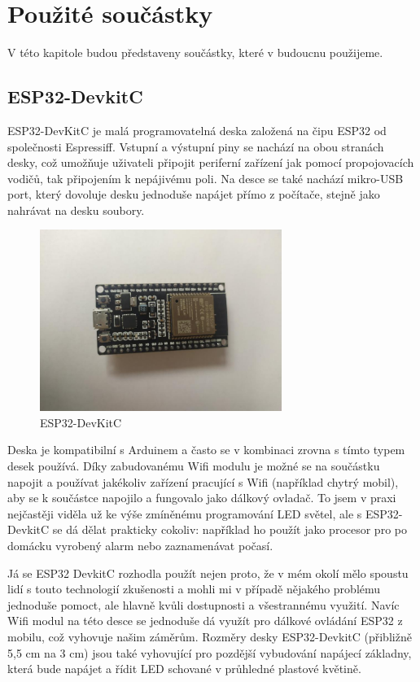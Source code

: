 \chapter{Použité součástky}

V této kapitole budou představeny součástky, které v budoucnu použijeme.

\section{ESP32-DevkitC}
ESP32-DevKitC je malá programovatelná deska založená na čipu ESP32 od společnosti Espressiff. Vstupní a výstupní piny se nachází na obou stranách desky, což umožňuje uživateli připojit periferní zařízení jak pomocí propojovacích vodičů, tak připojením k nepájivému poli. Na desce se také nachází mikro-USB port, který dovoluje  desku jednoduše napájet přímo z počítače, stejně jako nahrávat na desku soubory. 

\begin{figure}[htbp]
	\centering
	\includegraphics[width=0.7\textwidth]{img/ESPDevKit.jpg}
	\caption{ESP32-DevKitC}
\end{figure}

Deska je kompatibilní s Arduinem a často se v kombinaci zrovna s tímto typem desek používá. Díky zabudovanému Wifi modulu je možné se na součástku napojit a používat jakékoliv zařízení pracující s Wifi (například chytrý mobil), aby se k součástce napojilo a fungovalo jako dálkový ovladač. To jsem v praxi nejčastěji viděla už ke výše zmíněnému programování LED světel, ale s  ESP32-DevkitC se dá dělat prakticky cokoliv: například ho použít jako procesor pro po domácku vyrobený alarm nebo zaznamenávat počasí. 


Já se ESP32 DevkitC rozhodla použít nejen proto, že v mém okolí mělo spoustu lidí s touto technologií zkušenosti a mohli mi v případě nějakého problému jednoduše pomoct, ale hlavně kvůli dostupnosti a všestrannému využití. Navíc Wifi modul na této desce se jednoduše dá využít pro dálkové ovládání ESP32 z mobilu, což vyhovuje našim záměrům. Rozměry desky ESP32-DevkitC (přibližně 5,5 cm na 3 cm) jsou také vyhovující pro pozdější vybudování napájecí základny, která bude napájet a řídit LED schované v průhledné plastové květině.



